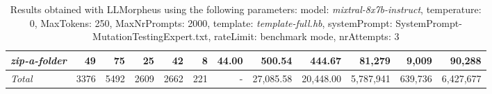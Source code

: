 \begin{table*}
{\begin{tabular}{l||r|r|r|r|r|r||r|r||r|r|r}
   \hline
   \textit{zip-a-folder} & 49 & 75 & 25 & 42 & 8 & 44.00 & 500.54 & 444.67 & 81,279 & 9,009 & 90,288 \\ 
   \hline
   \textit{Total} & 3376 & 5492 & 2609 & 2662 & 221 & - & 27,085.58  & 20,448.00 & 5,787,941 & 639,736 & 6,427,677 \\ 
 \end{tabular}
 }
 \caption{Results obtained with LLMorpheus using the following parameters: 
   model: \textit{mixtral-8x7b-instruct}, 
   temperature: 0, 
   MaxTokens: 250, 
   MaxNrPrompts: 2000, 
   template: \textit{template-full.hb}, 
   systemPrompt: SystemPrompt-MutationTestingExpert.txt, 
   rateLimit: benchmark mode, 
   nrAttempts: 3  
 }
\end{table*}

